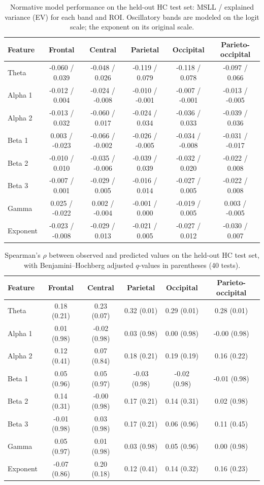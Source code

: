 \documentclass[11pt]{article}
\begin{document}
\begin{table}[ht]
\centering
\caption{Normative model performance on the held-out HC test set: MSLL / explained variance (EV) for each band and ROI. Oscillatory bands are modeled on the logit scale; the exponent on its original scale.}
\label{tab:norm_msll}
\small
\begin{tabular}{@{}lccccc@{}}
\toprule
Feature & Frontal & Central & Parietal & Occipital & Parieto-occipital \\
\midrule
Theta & -0.060 / 0.039 & -0.048 / 0.026 & -0.119 / 0.079 & -0.118 / 0.078 & -0.097 / 0.066 \\
Alpha 1 & -0.012 / 0.004 & -0.024 / -0.008 & -0.010 / -0.001 & -0.007 / -0.001 & -0.013 / -0.005 \\
Alpha 2 & -0.013 / 0.032 & -0.060 / 0.017 & -0.024 / 0.034 & -0.036 / 0.033 & -0.039 / 0.036 \\
Beta 1 & 0.003 / -0.023 & -0.066 / -0.002 & -0.026 / -0.005 & -0.034 / -0.008 & -0.031 / -0.017 \\
Beta 2 & -0.010 / 0.010 & -0.035 / -0.006 & -0.039 / 0.039 & -0.032 / 0.020 & -0.022 / 0.008 \\
Beta 3 & -0.007 / 0.001 & -0.029 / 0.005 & -0.016 / 0.014 & -0.027 / 0.005 & -0.022 / 0.008 \\
Gamma & 0.025 / -0.022 & 0.002 / -0.004 & -0.001 / 0.000 & -0.019 / 0.005 & 0.003 / -0.005 \\
Exponent & -0.023 / -0.008 & -0.029 / 0.013 & -0.021 / 0.005 & -0.027 / 0.012 & -0.030 / 0.007 \\
\bottomrule
\end{tabular}
\end{table}

\begin{table}[ht]
\centering
\caption{Spearman's $\rho$ between observed and predicted values on the held-out HC test set, with Benjamini--Hochberg adjusted $q$-values in parentheses (40 tests).}
\label{tab:norm_rho}
\small
\begin{tabular}{@{}lccccc@{}}
\toprule
Feature & Frontal & Central & Parietal & Occipital & Parieto-occipital \\
\midrule
Theta & 0.18 (0.21) & 0.23 (0.07) & 0.32 (0.01) & 0.29 (0.01) & 0.28 (0.01) \\
Alpha 1 & 0.01 (0.98) & -0.02 (0.98) & 0.03 (0.98) & 0.00 (0.98) & -0.00 (0.98) \\
Alpha 2 & 0.12 (0.41) & 0.07 (0.84) & 0.18 (0.21) & 0.19 (0.19) & 0.16 (0.22) \\
Beta 1 & 0.05 (0.96) & 0.05 (0.97) & -0.03 (0.98) & -0.02 (0.98) & -0.01 (0.98) \\
Beta 2 & 0.14 (0.31) & -0.00 (0.98) & 0.17 (0.21) & 0.14 (0.31) & 0.02 (0.98) \\
Beta 3 & -0.01 (0.98) & 0.03 (0.98) & 0.17 (0.21) & 0.06 (0.96) & 0.11 (0.45) \\
Gamma & 0.05 (0.97) & 0.01 (0.98) & 0.03 (0.98) & 0.05 (0.96) & 0.00 (0.98) \\
Exponent & -0.07 (0.86) & 0.20 (0.18) & 0.12 (0.41) & 0.14 (0.32) & 0.16 (0.23) \\
\bottomrule
\end{tabular}
\end{table}
\end{document}
